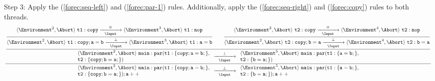 \noindent
Step 3: Apply the (\ref{forec:seq-left}) and (\ref{forec:par-1}) rules. 
Additionally, apply the (\ref{forec:seq-right}) and (\ref{forec:copy}) rules
to both threads.
\begin{equation*}
	\frac{
		\dfrac{
			\dfrac{
					\langle \Environment^2, \Abort \rangle ~ \mathtt{t1: copy}
						\xrightarrow[~~\Input~~]{0} 
					\langle \Environment^3, \Abort \rangle ~ \mathtt{t1: nop}
				}{
					\langle \Environment^2, \Abort \rangle ~ \mathtt{t1: copy; a=b}
						\xrightarrow[~~\Input~~]{\bot} 
					\langle \Environment^3, \Abort \rangle ~ \mathtt{t1: a=b}
				}
				\qquad
			\dfrac{
					\langle \Environment^2, \Abort \rangle ~ \mathtt{t2: copy}
						\xrightarrow[~~\Input~~]{0} 
					\langle \Environment^4, \Abort \rangle ~ \mathtt{t2: nop}
				}{
					\langle \Environment^2, \Abort \rangle ~ \mathtt{t2: copy; b=a}
						\xrightarrow[~~\Input~~]{\bot} 
					\langle \Environment^4, \Abort \rangle ~ \mathtt{t2: b=a}
				}
			}{
				\begin{array}{l}
					\langle \Environment^2, \Abort \rangle ~ \mathtt{main: par(t1:\{copy; a=b;\},}	\\
					\mathtt{t2:\{copy; b=a;\})}														\\
				\end{array}
					\xrightarrow[~~\Input~~]{\bot} 
				\begin{array}{l}
					\langle \Environment^5, \Abort \rangle ~ \mathtt{main: par(t1:\{a=b;\},}		\\
					\mathtt{t2:\{b=a;\})}															\\
				\end{array}
			}
		}{
			\begin{array}{l}
				\langle \Environment^2, \Abort \rangle ~ \mathtt{main: par(t1:\{copy; a=b;\},}	\\
				\mathtt{t2:\{copy; b=a;\}); a++}												\\
			\end{array}
				\xrightarrow[~~\Input~~]{\bot} 
			\begin{array}{l}
				\langle \Environment^5, \Abort \rangle ~ \mathtt{main: par(t1:\{a=b;\},}		\\
				\mathtt{t2:\{b=a;\}); a++}														\\
			\end{array}
		}
\end{equation*}

